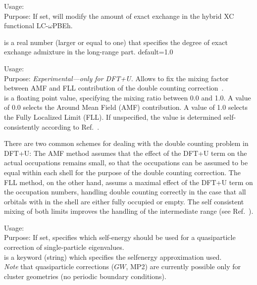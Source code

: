 {
 \noindent
 Usage:   \\[1.0ex]
 Purpose: If set, will modify the amount of exact exchange in the hybrid XC functional LC-$\omega$PBEh. 
          
  is a real number (larger or equal to one) that
          specifies the degree of exact exchange admixture in the long-range part. default=1.0\\
}

{
  \noindent
  Usage:   \\[1.0ex]
  Purpose: \emph{Experimental---only for DFT+U.} Allows to fix the mixing
    factor between AMF and FLL contribution of the double counting
    correction~\cite{Petukhov03}. \\[1.0ex] 
   is a floating point value, specifying the mixing
    ratio between 0.0 and 1.0. A value of 0.0 selects the Around Mean Field
    (AMF) contribution. A value of 1.0 selects the Fully Localized Limit
    (FLL). If unspecified, the value is determined self-consistently according
    to Ref.~\cite{Petukhov03}. \\ 
}

There are two common schemes for dealing with the double counting problem in DFT+U: The AMF method
assumes that the effect of the DFT+U term on the actual occupations remains small, so that the
occupations can be assumed to be equal within each shell for the purpose of the double counting
correction. The FLL method, on the other hand, assums a maximal effect of the DFT+U term on the
occupation numbers, handling double counting correctly in the case that all orbitals with in the
shell are either fully occupied or empty. The self consistent mixing of both limits improves the
handling of the intermediate range (see Ref.~\cite{Petukhov03}).

{
 \noindent
 Usage:   \\[1.0ex]
 Purpose: If set, specifies which self-energy should be used for a
 quasiparticle correction of single-particle eigenvalues. \\[1.0ex]
  is a keyword (string) which specifies the
   selfenergy approximation used. \\
}
\emph{Note} that quasiparticle corrections ($GW$, MP2) are currently possible
only for cluster geometries (no periodic boundary conditions).

